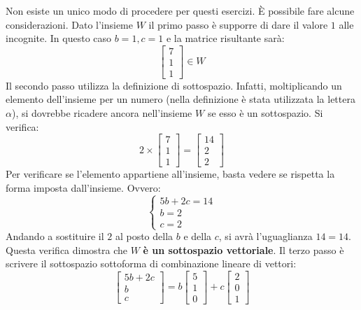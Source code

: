 \documentclass[a4paper]{article}
\begin{document}
	\noindent
	Non esiste un unico modo di procedere per questi esercizi. È possibile fare alcune considerazioni. Dato l'insieme $W$ il \textcolor{Red3}{primo passo} è supporre di dare il valore $1$ alle incognite. In questo caso $b = 1, c = 1$ e la matrice risultante sarà:
	\begin{equation*}
		\begin{bmatrix}
			7 \\
			1 \\
			1
		\end{bmatrix} \in W
	\end{equation*}
	Il \textcolor{Red3}{secondo passo} utilizza la definizione di sottospazio. Infatti, moltiplicando un elemento dell'insieme per un numero (nella definizione è stata utilizzata la lettera $\alpha$), si dovrebbe ricadere ancora nell'insieme $W$ se esso è un sottospazio. Si verifica:
	\begin{equation*}
		2 \times \begin{bmatrix}
			7 \\
			1 \\
			1
		\end{bmatrix} =
		\begin{bmatrix}
			14 \\
			2  \\
			2
		\end{bmatrix}
	\end{equation*}
	Per verificare se l'elemento appartiene all'insieme, basta vedere se rispetta la forma imposta dall'insieme. Ovvero:
	\begin{equation*}
		\begin{cases}
			5b + 2c = 14 \\
			b = 2 \\
			c = 2
		\end{cases}
	\end{equation*}
	Andando a sostituire il $2$ al posto della $b$ e della $c$, si avrà l'uguaglianza $14=14$. Questa verifica dimostra che $W$ \textbf{è un sottospazio vettoriale}. Il \textcolor{Red3}{terzo passo} è scrivere il sottospazio sottoforma di combinazione lineare di vettori:
	\begin{equation*}
		\begin{bmatrix}
			5b + 2c \\
			b \\
			c
		\end{bmatrix} =
		b \begin{bmatrix}
			5 \\
			1 \\
			0
		\end{bmatrix} +
		c \begin{bmatrix}
			2 \\
			0 \\
			1
		\end{bmatrix}
	\end{equation*}
\end{document}
